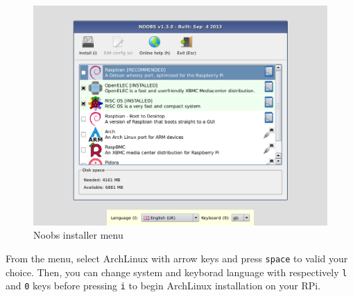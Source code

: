 \begin{figure}[h]
	\centering
	\includegraphics[scale=0.4]{images/NoobsMenu.png}
	\caption{Noobs installer menu}
	\label{figure:NoobsMenu}
\end{figure}

From the menu, select ArchLinux with arrow keys and press \og{}\texttt{space}
\fg{} to valid your choice. Then, you can change system and keyborad language with 
respectively \og{}\texttt{l}\fg{} and \og{}\texttt{0}\fg{} keys before 
pressing \og{}\texttt{i}\fg{} to begin ArchLinux installation on your RPi.
